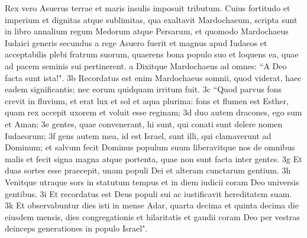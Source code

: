 \begin{biblechapter} 
\verse Rex vero Asuerus terrae et maris insulis imposuit tributum. 
\verse Cuius fortitudo et imperium et dignitas atque sublimitas, qua exaltavit Mardochaeum, scripta sunt in libro annalium regum Medorum atque Persarum, 
\verse et quomodo Mardochaeus Iudaici generis secundus a rege Asuero fuerit et magnus apud Iudaeos et acceptabilis plebi fratrum suorum, quaerens bona populo suo et loquens ea, quae ad pacem seminis sui pertinerent. 
\verse a Dixitque Mardochaeus ad omnes: “A Deo facta sunt ista!". 3b Recordatus est enim Mardochaeus somnii, quod viderat, haec eadem significantis; nec eorum quidquam irritum fuit. 3c “Quod parvus fons crevit in fluvium, et erat lux et sol et aqua plurima: fons et flumen est Esther, quam rex accepit uxorem et voluit esse reginam; 3d duo autem dracones, ego sum et Aman; 3e gentes, quae convenerant, hi sunt, qui conati sunt delere nomen Iudaeorum; 3f gens autem mea, id est Israel, sunt illi, qui clamaverunt ad Dominum; et salvum fecit Dominus populum suum liberavitque nos de omnibus malis et fecit signa magna atque portenta, quae non sunt facta inter gentes. 3g Et duas sortes esse praecepit, unam populi Dei et alteram cunctarum gentium. 3h Venitque utraque sors in statutum tempus et in diem iudicii coram Deo universis gentibus. 3i Et recordatus est Deus populi sui ac iustificavit hereditatem suam. 3k Et observabuntur dies isti in mense Adar, quarta decima et quinta decima die eiusdem mensis, dies congregationis et hilaritatis et gaudii coram Deo per vestras deinceps generationes in populo Israel".  
\end{biblechapter}
